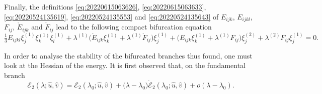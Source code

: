 \documentclass[12pt, final]{scrartcl}
\theoremstyle{definition}
\newcommand{\E}{\mathcal E}
\newcommand{\order}[2][1]{#2^{(#1)}}
\begin{document}

Finally, the definitions \eqref{eq:20220615063626}, \eqref{eq:20220615063633},
\eqref{eq:20220524135619}, \eqref{eq:20220524135553} and
\eqref{eq:20220524135643} of $E_{ijk}$, $E_{ijkl}$, $F_{ij}$,
$\mathring{E}_{ijk}$ and $\mathring{F}_{ij}$ lead to the following compact
bifurcation equation
\begin{equation}
  \label{eq:20220601070917}
  \tfrac{1}{3} E_{ijkl} \order[1]{\xi_j} \order[1]{\xi_k} \order[1]{\xi_l} + \order[1]\lambda \bigl( \mathring{E}_{ijk} \order[1]{\xi_k} + \order[1]\lambda \mathring{F}_{ij} \bigr)\order[1]{\xi_j} + \bigl(E_{ijk} \order[1]{\xi_k} + \order[1]\lambda F_{ij}\bigr) \order[2]{\xi_j} + \order[2]\lambda F_{ij} \order[1]{\xi_j} = 0.
\end{equation}

In order to analyse the stability of the bifurcated branches thus found, one
must look at the Hessian of the energy. It is first observed that, on the
fundamental branch
\begin{equation}
 \E_2(\lambda; \hat{u}, \hat{v}) = \E_2(\lambda_0; \hat{u}, \hat{v}) + \bigl(\lambda - \lambda_0\bigr) \dot{\E}_2(\lambda_0; \hat{u}, \hat{v}) + o(\lambda - \lambda_0).
\end{equation}
\end{document}
